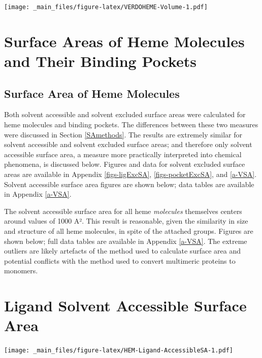 \documentclass[a4paper, nobind]{templates/ociamthesis}
\let\origfigure\figure
\let\endorigfigure\endfigure
\renewenvironment{figure}[1][2] {
    \expandafter\origfigure\expandafter[H]
} {
    \endorigfigure
}
\begin{document}
\begin{figure}
\centering
\texttt{[image: \_main\_files/figure-latex/VERDOHEME-Volume-1.pdf]}
\caption{\label{fig:VERDOHEME-Volume}VERDOHEME: Volume of Binding Pocket}
\end{figure}

\hypertarget{surface-areas-of-heme-molecules-and-their-binding-pockets}{%
\section{Surface Areas of Heme Molecules and Their Binding Pockets}\label{surface-areas-of-heme-molecules-and-their-binding-pockets}}

\hypertarget{surface-area-of-heme-molecules}{%
\subsection{Surface Area of Heme Molecules}\label{surface-area-of-heme-molecules}}

Both solvent accessible and solvent excluded surface areas were calculated for heme molecules and binding pockets. The differences between these two measures were discussed in Section \ref{SAmethods}. The results are extremely similar for solvent accessible and solvent excluded surface areas; and therefore only solvent accessible surface area, a measure more practically interpreted into chemical phenomena, is discussed below. Figures and data for solvent excluded surface areas are available in Appendix \ref{figs-ligExcSA}, \ref{figs-pocketExcSA}, and \ref{a-VSA}. Solvent accessible surface area figures are shown below; data tables are available in Appendix \ref{a-VSA}.

The solvent accessible surface area for all heme \emph{molecules} themselves centers around values of 1000 A². This result is reasonable, given the similarity in size and structure of all heme molecules, in spite of the attached groups. Figures are shown below; full data tables are available in Appendix \ref{a-VSA}. The extreme outliers are likely artefacts of the method used to calculate surface area and potential conflicts with the method used to convert multimeric proteins to monomers.

\hypertarget{figs-ligAccSA}{%
\section{Ligand Solvent Accessible Surface Area}\label{figs-ligAccSA}}

\begin{figure}
\centering
\texttt{[image: \_main\_files/figure-latex/HEM-Ligand-AccessibleSA-1.pdf]}
\caption{\label{fig:HEM-Ligand-AccessibleSA}HEM: Ligand Accessible Surface Area}
\end{figure}
\end{document}
